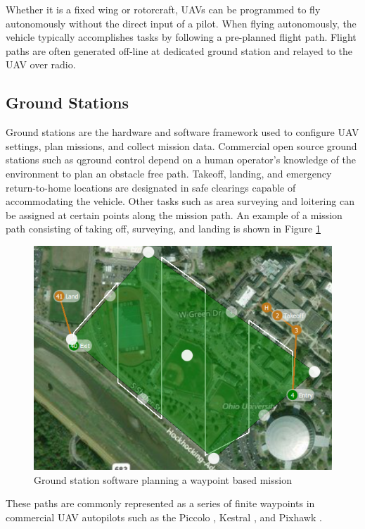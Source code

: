 \documentclass[numbered,pdftex]{ohio-etd}
\begin{document}
Whether it is a fixed wing or rotorcraft, UAVs can be programmed to fly autonomously without the direct input of a pilot. When flying autonomously, the vehicle typically accomplishes tasks by following a pre-planned flight path. Flight paths are often generated off-line at dedicated ground station and relayed to the UAV over radio. 

\subsection{Ground Stations}
Ground stations are the hardware and software framework used to configure UAV settings, plan missions, and collect mission data. Commercial open source ground stations such as qground control \cite{qgc} depend on a human operator's knowledge of the environment to plan an obstacle free path. Takeoff, landing, and emergency return-to-home locations are designated in safe clearings capable of accommodating the vehicle. Other tasks such as area surveying and loitering can be assigned at certain points along the mission path. An example of a mission path consisting of taking off, surveying, and landing is shown in Figure \ref{fig:groundstationplanning}




\begin{figure}[H]
	\centering
	\includegraphics[width=12cm]{PaperFigures/Literature/groundStationPlanning}
	\caption{Ground station software planning a waypoint based mission}
	\label{fig:groundstationplanning}
\end{figure}

These paths are commonly represented as a series of finite waypoints in commercial UAV autopilots such as  the Piccolo \cite{piccolo}, Kestral \cite{kestrel}, and Pixhawk \cite{pix}.
\end{document}
